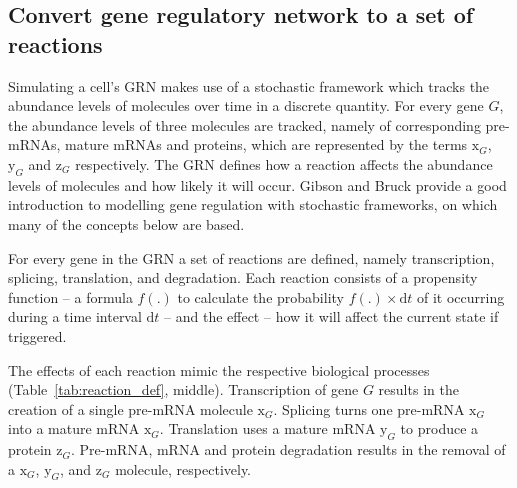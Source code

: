 \documentclass[
  table,
  10pt,
  a4paper]{article}
\begin{document}
\hypertarget{sec:dyngen-reactions}{%
\subsection{Convert gene regulatory network to a set of
reactions}\label{sec:dyngen-reactions}}

\newcommand{\x}[1]{\text{x}_{#1}}
\newcommand{\y}[1]{\text{y}_{#1}}
\newcommand{\z}[1]{\text{z}_{#1}}

\newcommand{\rs}[1]{\text{R}_{#1}}
\newcommand{\rp}[1]{\text{R}^+_{#1}}
\newcommand{\rn}[1]{\text{R}^-_{#1}}

\newcommand{\xpr}[1]{\text{xpr}_{#1}}
\newcommand{\xhl}[1]{\text{xhl}_{#1}}
\newcommand{\ysr}[1]{\text{ysr}_{#1}}
\newcommand{\yhl}[1]{\text{yhl}_{#1}}
\newcommand{\ydr}[1]{\text{ydr}_{#1}}
\newcommand{\zpr}[1]{\text{zpr}_{#1}}
\newcommand{\zhl}[1]{\text{zhl}_{#1}}
\newcommand{\zdr}[1]{\text{zdr}_{#1}}

\newcommand{\str}[1]{\text{str}_{#1}}
\newcommand{\hill}[1]{\text{hill}_{#1}}
\newcommand{\ind}[1]{\text{ind}_{#1}}
\newcommand{\dis}[1]{\text{dis}_{#1}}
\newcommand{\buf}[1]{\text{bind}_{#1}}
\newcommand{\ba}[1]{\text{bas}_{#1}}

Simulating a cell's GRN makes use of a stochastic framework which tracks
the abundance levels of molecules over time in a discrete quantity. For
every gene \(G\), the abundance levels of three molecules are tracked,
namely of corresponding pre-mRNAs, mature mRNAs and proteins, which are
represented by the terms \(\text{x}_{G}\), \(\text{y}_{G}\) and
\(\text{z}_{G}\) respectively. The GRN defines how a reaction affects
the abundance levels of molecules and how likely it will occur. Gibson
and Bruck \autocite{gibson_probabilisticmodelprokaryotic_2000} provide a
good introduction to modelling gene regulation with stochastic
frameworks, on which many of the concepts below are based.

For every gene in the GRN a set of reactions are defined, namely
transcription, splicing, translation, and degradation. Each reaction
consists of a propensity function -- a formula \(f(.)\) to calculate the
probability \(f(.) \times \text{d}t\) of it occurring during a time
interval \(\text{d}t\) -- and the effect -- how it will affect the
current state if triggered.

The effects of each reaction mimic the respective biological processes
(Table~\ref{tab:reaction_def}, middle). Transcription of gene \(G\)
results in the creation of a single pre-mRNA molecule \(\text{x}_{G}\).
Splicing turns one pre-mRNA \(\text{x}_{G}\) into a mature mRNA
\(\text{x}_{G}\). Translation uses a mature mRNA \(\text{y}_{G}\) to
produce a protein \(\text{z}_{G}\). Pre-mRNA, mRNA and protein
degradation results in the removal of a \(\text{x}_{G}\),
\(\text{y}_{G}\), and \(\text{z}_{G}\) molecule, respectively.
\end{document}
